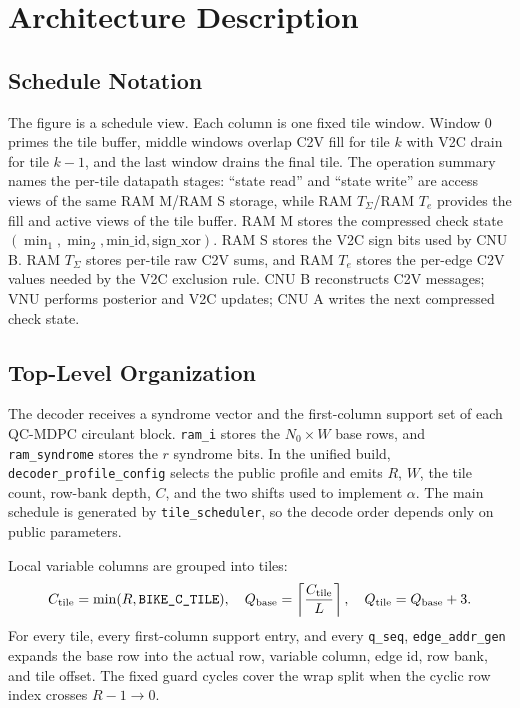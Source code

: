 \documentclass{article}
\begin{document}
\ifPDFTeX
\section{Architecture Description}

\subsection{Schedule Notation}

The figure is a schedule view. Each column is one fixed tile window. Window 0
primes the tile buffer, middle windows overlap C2V fill for tile $k$ with V2C
drain for tile $k-1$, and the last window drains the final tile. The operation
summary names the per-tile datapath stages: ``state read'' and ``state write''
are access views of the same RAM M/RAM S storage, while RAM $T_\Sigma$/RAM
$T_e$ provides the fill and active views of the tile buffer.
RAM M stores the compressed check state
$(\min_1,\min_2,\text{min\_id},\text{sign\_xor})$. RAM S stores the V2C sign
bits used by CNU B. RAM $T_\Sigma$ stores per-tile raw C2V sums, and RAM $T_e$
stores the per-edge C2V values needed by the V2C exclusion rule. CNU B
reconstructs C2V messages; VNU performs posterior and V2C updates; CNU A writes
the next compressed check state.

\subsection{Top-Level Organization}

The decoder receives a syndrome vector and the first-column support set of each
QC-MDPC circulant block. \texttt{ram\_i} stores the $N_0\times W$ base rows, and
\texttt{ram\_syndrome} stores the $r$ syndrome bits. In the unified build,
\texttt{decoder\_profile\_config} selects the public profile and emits $R$, $W$,
the tile count, row-bank depth, $C$, and the two shifts used to implement
$\alpha$. The main schedule is generated by \texttt{tile\_scheduler}, so the
decode order depends only on public parameters.

Local variable columns are grouped into tiles:
\[
  C_{\rm tile}=\min(R,\text{\texttt{BIKE\_C\_TILE}}),\quad
  Q_{\rm base}=\left\lceil\frac{C_{\rm tile}}{L}\right\rceil,\quad
  Q_{\rm tile}=Q_{\rm base}+3 .
\]
For every tile, every first-column support entry, and every \texttt{q\_seq},
\texttt{edge\_addr\_gen} expands the base row into the actual row, variable
column, edge id, row bank, and tile offset. The fixed guard cycles cover the
wrap split when the cyclic row index crosses $R-1\rightarrow 0$.
\end{document}
